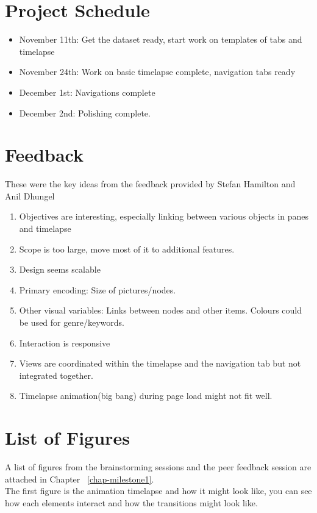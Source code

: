 \documentclass{report}
\begin{document}
\section{Project Schedule}
\begin{itemize}
\item November 11th: Get the dataset ready, start work on templates of tabs and timelapse
\item November 24th: Work on basic timelapse complete, navigation tabs ready
\item December 1st: Navigations complete
\item December 2nd: Polishing complete.
\end{itemize}

\section{Feedback}
These were the key ideas from the feedback provided by Stefan Hamilton and Anil Dhungel
\begin{enumerate}
\item Objectives are interesting, especially linking between various objects in panes and timelapse
\item Scope is too large, move most of it to additional features.
\item Design seems scalable
\item Primary encoding: Size of pictures/nodes. 
\item Other visual variables: Links between nodes and other items. 
Colours could be used for genre/keywords.
\item Interaction is responsive 
\item Views are coordinated within the timelapse and the navigation tab but not integrated together.
\item Timelapse animation(big bang) during page load might not fit well.
\end{enumerate}
\section{List of Figures}
A list of figures from the brainstorming sessions and the peer feedback session are attached in Chapter ~\ref{chap-milestone1}.\\


The first figure is the animation timelapse and how it might look like, you can see how each elements interact and how the transitions might look like.\\
\end{document}
